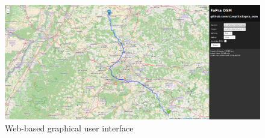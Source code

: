 \documentclass[a4paper]{scrartcl}
\begin{document}
\begin{figure}[t]
\centering
\includegraphics[width=1.0\columnwidth]{img/screenshot.png}
\caption{Web-based graphical user interface}
\label{gui}
\end{figure}
\end{document}
